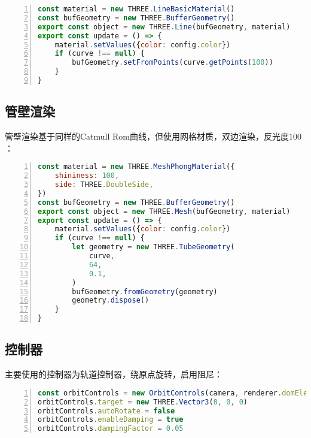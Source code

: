 \begin{lstlisting}[language=JavaScript,
   backgroundcolor=\color{lightgray},
   extendedchars=true,
   basicstyle=\footnotesize\ttfamily,
   showstringspaces=false,
   showspaces=false,
   numbers=left,
   numberstyle=\footnotesize,
   numbersep=9pt,
   tabsize=2,
   breaklines=true,
   showtabs=false,
   captionpos=b]
const material = new THREE.LineBasicMaterial()
const bufGeometry = new THREE.BufferGeometry()
export const object = new THREE.Line(bufGeometry, material)
export const update = () => {
    material.setValues({color: config.color})
    if (curve !== null) {
        bufGeometry.setFromPoints(curve.getPoints(100))
    }
}
\end{lstlisting}

\subsection{管壁渲染}

管壁渲染基于同样的Catmull Rom曲线，但使用网格材质，双边渲染，反光度$100$：

\begin{lstlisting}[language=JavaScript,
   backgroundcolor=\color{lightgray},
   extendedchars=true,
   basicstyle=\footnotesize\ttfamily,
   showstringspaces=false,
   showspaces=false,
   numbers=left,
   numberstyle=\footnotesize,
   numbersep=9pt,
   tabsize=2,
   breaklines=true,
   showtabs=false,
   captionpos=b]
const material = new THREE.MeshPhongMaterial({
    shininess: 100,
    side: THREE.DoubleSide,
})
const bufGeometry = new THREE.BufferGeometry()
export const object = new THREE.Mesh(bufGeometry, material)
export const update = () => {
    material.setValues({color: config.color})
    if (curve !== null) {
        let geometry = new THREE.TubeGeometry(
            curve,
            64,
            0.1,
        )
        bufGeometry.fromGeometry(geometry)
        geometry.dispose()
    }
}
\end{lstlisting}

\subsection{控制器}

主要使用的控制器为轨道控制器，绕原点旋转，启用阻尼：

\begin{lstlisting}[language=JavaScript,
   backgroundcolor=\color{lightgray},
   extendedchars=true,
   basicstyle=\footnotesize\ttfamily,
   showstringspaces=false,
   showspaces=false,
   numbers=left,
   numberstyle=\footnotesize,
   numbersep=9pt,
   tabsize=2,
   breaklines=true,
   showtabs=false,
   captionpos=b]
const orbitControls = new OrbitControls(camera, renderer.domElement)
orbitControls.target = new THREE.Vector3(0, 0, 0)
orbitControls.autoRotate = false
orbitControls.enableDamping = true
orbitControls.dampingFactor = 0.05
\end{lstlisting}

